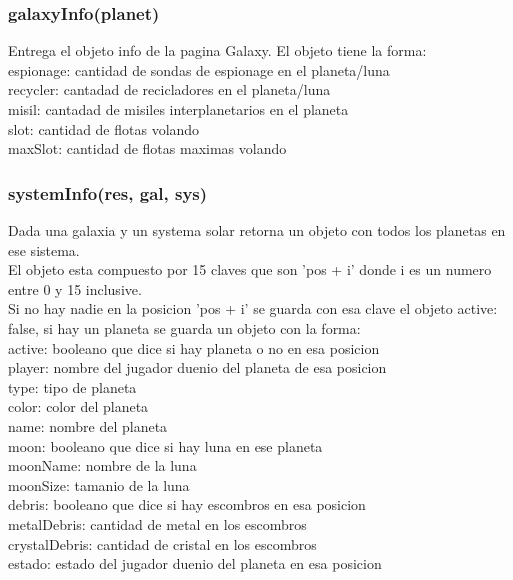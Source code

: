 \documentclass{article}
\newcommand\tab[1][1cm]{\hspace*{#1}}
\begin{document}
        \subsubsection{galaxyInfo(planet)}
            Entrega el objeto info de la pagina Galaxy. El objeto tiene la forma:\\
            \tab espionage: cantidad de sondas de espionage en el planeta/luna\\
            \tab recycler: cantadad de recicladores en el planeta/luna\\
            \tab misil: cantadad de misiles interplanetarios en el planeta\\
            \tab slot: cantidad de flotas volando\\
            \tab maxSlot: cantidad de flotas maximas volando\\
        \subsubsection{systemInfo(res, gal, sys)}
            Dada una galaxia y un systema solar retorna un objeto con todos los planetas en ese sistema.\\
            El objeto esta compuesto por 15 claves que son 'pos + i' donde i es un numero entre 0 y 15 inclusive.\\
            Si no hay nadie en la posicion 'pos + i' se guarda con esa clave el objeto {active: false}, si hay un planeta se guarda un objeto con la forma:\\
            \tab active: booleano que dice si hay planeta o no en esa posicion\\
            \tab player: nombre del jugador duenio del planeta de esa posicion\\
            \tab type: tipo de planeta\\
            \tab color: color del planeta\\
            \tab name: nombre del planeta\\
            \tab moon: booleano que dice si hay luna en ese planeta\\
            \tab moonName: nombre de la luna\\
            \tab moonSize: tamanio de la luna\\
            \tab debris: booleano que dice si hay escombros en esa posicion\\
            \tab metalDebris: cantidad de metal en los escombros\\
            \tab crystalDebris: cantidad de cristal en los escombros\\
            \tab estado: estado del jugador duenio del planeta en esa posicion\\
\end{document}
